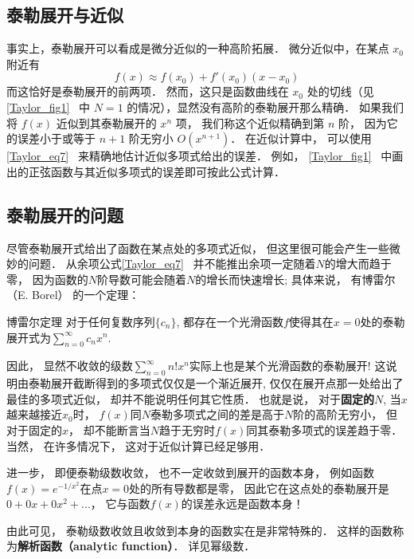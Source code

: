 

\subsection{泰勒展开与近似}
事实上，泰勒展开可以看成是微分近似的一种高阶拓展． 微分近似中，在某点 $x_0$ 附近有
\begin{equation}
f(x) \approx f(x_0) + f'(x_0)(x - x_0)
\end{equation}
而这恰好是泰勒展开的前两项． 然而，这只是函数曲线在 $x_0$ 处的切线（见\autoref{Taylor_fig1}~ 中 $N=1$ 的情况），显然没有高阶的泰勒展开那么精确． 如果我们将 $f(x)$ 近似到其泰勒展开的 $x^n$ 项， 我们称这个近似精确到第 $n$ 阶， 因为它的误差小于或等于 $n + 1$ 阶无穷小 $O(x^{n + 1})$． 在近似计算中， 可以使用\autoref{Taylor_eq7}~ 来精确地估计近似多项式给出的误差． 例如， \autoref{Taylor_fig1}~ 中画出的正弦函数与其近似多项式的误差即可按此公式计算．

\subsection{泰勒展开的问题}
尽管泰勒展开式给出了函数在某点处的多项式近似， 但这里很可能会产生一些微妙的问题． 从余项公式\autoref{Taylor_eq7}~ 并不能推出余项一定随着$N$的增大而趋于零， 因为函数的$N$阶导数可能会随着$N$的增长而快速增长; 具体来说， 有博雷尔（E. Borel） 的一个定理：
\begin{theorem}{博雷尔定理}
对于任何复数序列$\{c_n\}$, 都存在一个光滑函数$f$使得其在$x=0$处的泰勒展开式为$\sum_{n=0}^\infty c_nx^n$.
\end{theorem}
因此， 显然不收敛的级数$\sum_{n=0}^\infty n!x^n$实际上也是某个光滑函数的泰勒展开! 这说明由泰勒展开截断得到的多项式仅仅是一个渐近展开, 仅仅在展开点那一处给出了最佳的多项式近似， 却并不能说明任何其它性质． 也就是说， 对于\textbf{固定的$N$}, 当$x$越来越接近$x_0$时， $f(x)$同$N$泰勒多项式之间的差是高于$N$阶的高阶无穷小， 但对于固定的$x$， 却不能断言当$N$趋于无穷时$f(x)$同其泰勒多项式的误差趋于零． 当然， 在许多情况下， 这对于近似计算已经足够用．

进一步， 即便泰勒级数收敛， 也不一定收敛到展开的函数本身， 例如函数$f(x)=e^{-1/x^2}$在点$x=0$处的所有导数都是零， 因此它在这点处的泰勒展开是$0+0x+0x^2+...$， 它与函数$f(x)$的误差永远是函数本身！

由此可见， 泰勒级数收敛且收敛到本身的函数实在是非常特殊的． 这样的函数称为\textbf{解析函数（analytic function）}． 详见幂级数．
